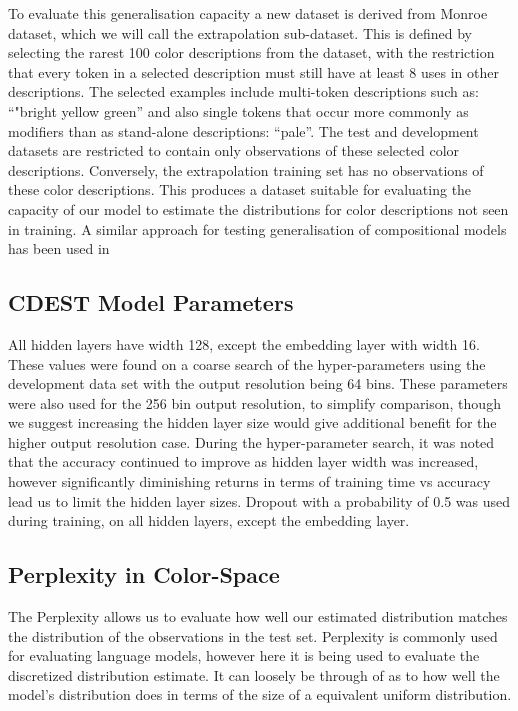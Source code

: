 \documentclass[11pt,letterpaper]{article}
\newcommand{\parencite}{\cite}
\newcommand{\textcite}{\newcite}
\begin{document}
To evaluate this generalisation capacity a new dataset is derived from Monroe dataset, which we will call the extrapolation sub-dataset.
This is defined by selecting the rarest 100 color descriptions from the dataset,
with the restriction that every token in a selected description must still have at least 8 uses in other descriptions.
The selected examples include multi-token descriptions such as: ``"bright yellow green'' and also single tokens that occur more commonly as modifiers than as stand-alone descriptions: ``pale''.
The test and development datasets are restricted to contain only observations of these selected color descriptions.
Conversely, the extrapolation training set has no observations of these color descriptions.
This produces a dataset suitable for evaluating the capacity of our model to estimate the distributions for color descriptions not seen in training.
A similar approach for testing generalisation of compositional models has been used in \textcite{DBLP:journals/corr/AtzmonBKGC16}

\subsection{CDEST Model Parameters}
All hidden layers have width 128, except the embedding layer with width 16.
These values were found on a coarse search of the hyper-parameters using the development data set with the output resolution being 64 bins.
These parameters were also used for the 256 bin output resolution, to simplify comparison, though we suggest increasing the hidden layer size would give additional benefit for the higher output resolution case.
During the hyper-parameter search, it was noted that the accuracy continued to improve as hidden layer width was increased,
however significantly diminishing returns in terms of training time vs accuracy lead us to limit the hidden layer sizes.
Dropout \parencite{srivastava2014dropout} with a probability of 0.5 was used during training, on all hidden layers, except the embedding layer.


\subsection{Perplexity in Color-Space}
The Perplexity allows us to evaluate how well our estimated distribution matches the distribution of the observations in the test set.
Perplexity is commonly used for evaluating language models, however here it is being used to evaluate the discretized distribution estimate.
It can loosely be through of as to how well the model's distribution does in terms of the size of a equivalent uniform distribution.
\end{document}
